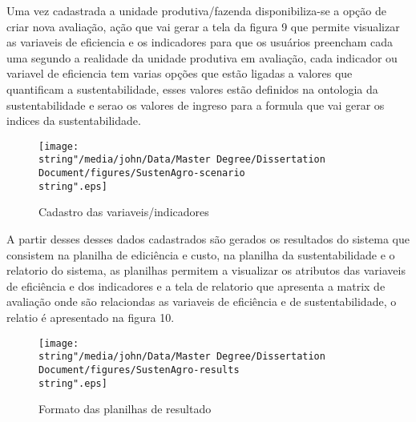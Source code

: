 Uma vez cadastrada a unidade produtiva/fazenda disponibiliza-se a
opção de criar nova avaliação, ação que vai gerar a tela da figura
9 que permite visualizar as variaveis de eficiencia e os indicadores
para que os usuários preencham cada uma segundo a realidade da unidade
produtiva em avaliação, cada indicador ou variavel de eficiencia tem
varias opções que estão ligadas a valores que quantificam a sustentabilidade,
esses valores estão definidos na ontologia da sustentabilidade e serao
os valores de ingreso para a formula que vai gerar os indices da sustentabilidade. 

\begin{figure}
\texttt{[image: \\string"/media/john/Data/Master Degree/Dissertation Document/figures/SustenAgro-scenario\\string".eps]}

\caption{Cadastro das variaveis/indicadores}
\end{figure}

A partir desses desses dados cadastrados são gerados os resultados
do sistema que consistem na planilha de ediciência e custo, na planilha
da sustentabilidade e o relatorio do sistema, as planilhas permitem
a visualizar os atributos das variaveis de eficiência e dos indicadores
e a tela de relatorio que apresenta a matrix de avaliação onde são
relaciondas as variaveis de eficiência e de sustentabilidade, o relatio
é apresentado na figura 10. 

\begin{figure}
\texttt{[image: \\string"/media/john/Data/Master Degree/Dissertation Document/figures/SustenAgro-results\\string".eps]}

\caption{Formato das planilhas de resultado}
\end{figure}

